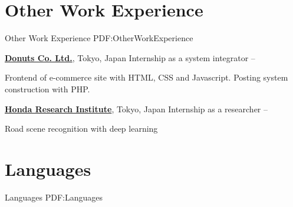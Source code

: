 \documentclass[letterpaper,MMMyyyy,nonstop]{simpleresumecv}
\begin{document}
\begin{body}
%
%


\section
{Other Work\newline
Experience}
{Other Work Experience}
{PDF:OtherWorkExperience}

\href{http://www.donuts.ne.jp}
{\textbf{Donuts Co. Ltd.}},
Tokyo, Japan
\GapNoBreak
\BulletItem
Internship as a system integrator
\hfill
{} --
\begin{detail}
\SubBulletItem
Frontend of e-commerce site with HTML, CSS and Javascript.
\SubBulletItem
Posting system construction with PHP.
\end{detail}

\href{http://www.honda-ri.com/}
{\textbf{Honda Research Institute}},
Tokyo, Japan
\GapNoBreak
\BulletItem
Internship as a researcher
\hfill
{} --
\begin{detail}
\SubBulletItem
Road scene recognition with deep learning
\end{detail}


\section
{Languages}
{Languages}
{PDF:Languages}


\end{body}
\end{document}
